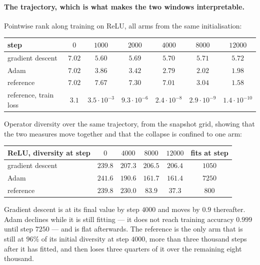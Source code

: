 \documentclass{article} %
\theoremstyle{plain}
\theoremstyle{definition}
\theoremstyle{remark}
\begin{document}
\paragraph{The trajectory, which is what makes the two windows interpretable.}
Pointwise rank along training on ReLU, all arms from the same initialisation:

\begin{center}\small
\begin{tabular}{lcccccc}
\toprule
step & $0$ & $1000$ & $2000$ & $4000$ & $8000$ & $12000$ \\
\midrule
gradient descent & $7.02$ & $5.60$ & $5.69$ & $5.70$ & $5.71$ & $5.72$ \\
Adam             & $7.02$ & $3.86$ & $3.42$ & $2.79$ & $2.02$ & $1.98$ \\
reference        & $7.02$ & $\mathbf{7.67}$ & $\mathbf{7.30}$ & $\mathbf{7.01}$ & $3.04$ & $1.58$ \\
\midrule
reference, train loss & $3.1$ & $3.5\cdot10^{-3}$ & $9.3\cdot10^{-6}$ & $2.4\cdot10^{-8}$
 & $2.9\cdot10^{-9}$ & $1.4\cdot10^{-10}$ \\
\bottomrule
\end{tabular}
\end{center}

\noindent Operator diversity over the same trajectory, from the snapshot grid, showing that the
two measures move together and that the collapse is confined to one arm:

\begin{center}\small
\begin{tabular}{lccccc}
\toprule
ReLU, diversity at step & $0$ & $4000$ & $8000$ & $12000$ & fits at step \\
\midrule
gradient descent & $239.8$ & $207.3$ & $206.5$ & $206.4$ & $1050$ \\
Adam             & $241.6$ & $190.6$ & $161.7$ & $161.4$ & $7250$ \\
reference        & $239.8$ & $\mathbf{230.0}$ & $83.9$ & $37.3$ & $800$ \\
\bottomrule
\end{tabular}
\end{center}

\noindent Gradient descent is at its final value by step $4000$ and moves by $0.9$ thereafter.
Adam declines while it is still fitting --- it does not reach training accuracy $0.999$ until step
$7250$ --- and is flat afterwards. The reference is the only arm that is still at $96\%$ of its
initial diversity at step $4000$, more than three thousand steps after it has fitted, and then
loses three quarters of it over the remaining eight thousand.
\end{document}
